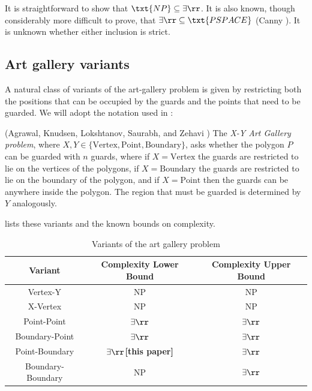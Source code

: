 It is straightforward to show that $\txt{NP}\subseteq\exists\rr$. It is also known, though considerably more difficult to prove, that $\exists\rr\subseteq \txt{PSPACE}$ (Canny \cite{SubsetPSPACE}). It is unknown whether either inclusion is strict. 

\subsection{Art gallery variants}

A natural class of variants of the art-gallery problem is given by restricting both the positions that can be occupied by the guards and the points that need to be guarded. We will adopt the notation used in \cite{AlmostConvex}:

\begin{definition}
(Agrawal, Knudsen, Lokshtanov, Saurabh, and Zehavi \cite{AlmostConvex}) The \emph{X-Y Art Gallery problem}, where $X, Y\in \{\text{Vertex}, \text{Point}, \text{Boundary}\}$, asks whether the polygon $P$ can be guarded with $n$ guards, where if $X=\text{Vertex}$ the guards are restricted to lie on the vertices of the polygons, if $X=\text{Boundary}$ the guards are restricted to lie on the boundary of the polygon, and if $X=\text{Point}$ then the guards can be anywhere inside the polygon. The region that must be guarded is determined by $Y$ analogously.
\end{definition}

 lists these variants and the known bounds on complexity.

\begin{table}[ht]
\begin{center}
\begin{tabu}{|c|c|c|}
\hline
Variant&Complexity Lower Bound&Complexity Upper Bound\\
\hline
Vertex-Y&NP\cite{NPHardness}&NP\\
X-Vertex&NP\cite{NPHardness}&NP\\
Point-Point&$\exists\rr$\cite{ExistsRHardness}&$\exists\rr$\cite{ExistsRHardness}\\
Boundary-Point&$\exists\rr$\cite{ExistsRHardness}&$\exists\rr$\cite{ExistsRHardness}\\
Point-Boundary&$\mathbf{\exists\rr}${\bf [this paper]}&$\exists\rr$\cite{ExistsRHardness}\\
Boundary-Boundary&NP\cite{NPHardness}&$\exists\rr$\cite{ExistsRHardness}\\
\hline
\end{tabu}
\caption{Variants of the art gallery problem}
\label{tab:InitialsTable}
\end{center}
\end{table}

